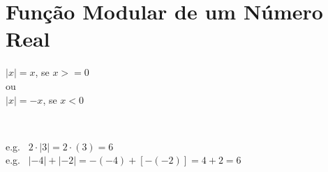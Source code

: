 \section{Função Modular de um Número Real}

	\begin{Large}
	$ |x| = x$, se $x>=0 $ \\
	ou\\
	$ |x| = -x$, se $x<0 $	
	\end{Large}

	\
	
	e.g. \ $2 \cdot |3| = 2 \cdot (3) = 6$\\
	e.g. \ $|-4| + |-2| = -(-4) + [- (-2)] = 4 + 2 = 6$